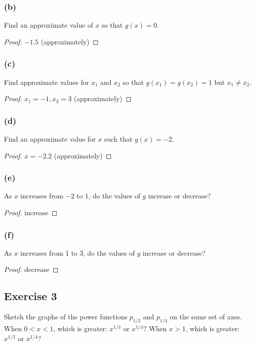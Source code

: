 \documentclass[14pt]{extarticle}
\begin{document}
\subsubsection{(b)}
Find an approximate value of \(x\) so that \(g(x) = 0\).
\begin{proof}
\(-1.5\) (approximately)
\end{proof}

\subsubsection{(c)}
Find approximate values for \(x_1\) and \(x_2\) so that \(g(x_1) = g(x_2) = 1\) but \(x_1 \neq x_2\).
\begin{proof}
\(x_1 = -1, x_2 = 3\) (approximately)
\end{proof}

\subsubsection{(d)}
Find an approximate value for \(x\) such that \(g(x) = -2\).
\begin{proof}
\(x = -2.2\) (approximately)
\end{proof}

\subsubsection{(e)}
As \(x\) increases from \(-2\) to \(1\), do the values of \(g\) increase or decrease?

\begin{proof}
increase
\end{proof}

\subsubsection{(f)}
As \(x\) increases from 1 to 3, do the values of \(g\) increase or decrease?

\begin{proof}
decrease
\end{proof}

\subsection{Exercise 3}
Sketch the graphs of the power functions \(p_{1/3}\) and \(p_{1/4}\) on the same set of axes. When \(0 < x < 1\), which 
is greater: \(x^{1/3}\) or \(x^{1/4}\)? When \(x > 1\), which is greater: \(x^{1/3}\) or \(x^{1/4}\)?
\end{document}
